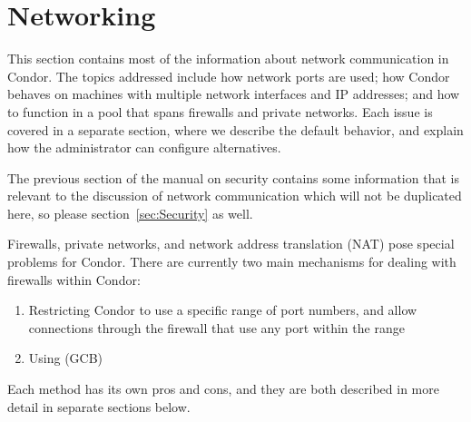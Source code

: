 \section{\label{sec:Networking}Networking}

This section contains most of the information about network
communication in Condor.
The topics addressed include how network ports are used; how Condor
behaves on machines with multiple network interfaces and IP addresses;
and how to function in a pool that spans firewalls and private
networks.
Each issue is covered in a separate section, where we describe the
default behavior, and explain how the administrator can configure
alternatives.

The previous section of the manual on security contains some
information that is relevant to the discussion of network
communication which will not be duplicated here, so please
section~\ref{sec:Security} as well.

Firewalls, private networks, and network address translation (NAT)
pose special problems for Condor.
There are currently two main mechanisms for dealing with firewalls
within Condor:

\begin{enumerate}

\item Restricting Condor to use a specific range of port numbers, and
  allow connections through the firewall that use any port within the
  range

\item Using  (GCB)

\end{enumerate}

Each method has its own pros and cons, and they are both described in
more detail in separate sections below.







